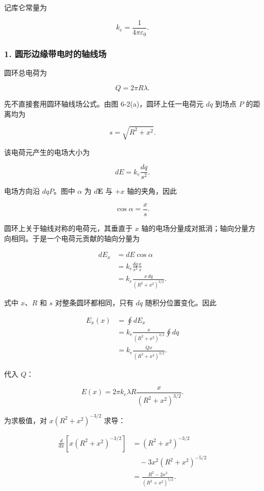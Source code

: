 \documentclass[12pt,a4paper,UTF8]{ctexart}
\begin{document}
记库仑常量为

\[
k_e=\frac{1}{4\pi\varepsilon_0}.
\]

\subsubsection{1.
圆形边缘带电时的轴线场}\label{ux5706ux5f62ux8fb9ux7f18ux5e26ux7535ux65f6ux7684ux8f74ux7ebfux573a}

圆环总电荷为

\[
Q=2\pi R\lambda.
\]

先不直接套用圆环轴线场公式。由图 6-2(a)，圆环上任一电荷元 \(dq\) 到场点
\(P\) 的距离均为

\[
s=\sqrt{R^2+x^2}.
\]

该电荷元产生的电场大小为

\[
dE=k_e\frac{dq}{s^2}.
\]

电场方向沿 \(dqP\)。图中 \(\alpha\) 为 \(d\bm E\) 与 \(+x\)
轴的夹角，因此

\[
\cos\alpha=\frac{x}{s}.
\]

圆环上关于轴线对称的电荷元，其垂直于 \(x\)
轴的电场分量成对抵消；轴向分量方向相同。于是一个电荷元贡献的轴向分量为

\[
\begin{aligned}
dE_x
&=dE\cos\alpha\\
&=k_e\frac{dq}{s^2}\frac{x}{s}\\
&=k_e\frac{x\,dq}{(R^2+x^2)^{3/2}}.
\end{aligned}
\]

式中 \(x\)、\(R\) 和 \(s\) 对整条圆环都相同，只有 \(dq\)
随积分位置变化。因此

\[
\begin{aligned}
E_x(x)
&=\oint dE_x\\
&=k_e\frac{x}{(R^2+x^2)^{3/2}}\oint dq\\
&=k_e\frac{Qx}{(R^2+x^2)^{3/2}}.
\end{aligned}
\]

代入 \(Q\)：

\[
E(x)=2\pi k_e\lambda R
\frac{x}{(R^2+x^2)^{3/2}}.
\]

为求极值，对 \(x(R^2+x^2)^{-3/2}\) 求导：

\[
\begin{aligned}
\frac{d}{dx}\left[x(R^2+x^2)^{-3/2}\right]
&=(R^2+x^2)^{-3/2}\\
&\quad-3x^2(R^2+x^2)^{-5/2}\\
&=\frac{R^2-2x^2}{(R^2+x^2)^{5/2}}.
\end{aligned}
\]
\end{document}
